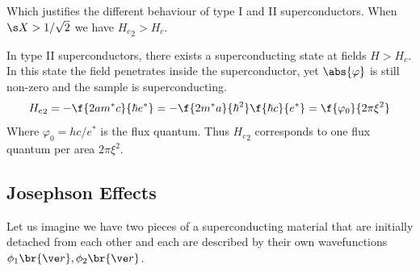 \documentclass{article}
\newcommand{\vp}{\varphi}
\begin{document}
Which justifies the different behaviour of type I and II superconductors. When $\s X > 1 / \sqrt{2}$ we have ${H_c}_2 > H_c$.
\begin{center}
\end{center}
In type II superconductors, there exists a superconducting state at fields $H > H_c$. In this state the field penetrates inside the superconductor, yet $\abs{\vp}$ is still non-zero and the sample is superconducting.
\[ {H_c}_2 = -\f{2a m^* c}{\hbar e^*} = - \f{2m^* a}{\hbar^2} \f{\hbar c}{e^*} = \f{\varphi_0}{2 \pi \xi^2} \]
Where $\varphi_0 = h c /e^*$ is the flux quantum. Thus ${H_c}_2$ corresponds to one flux quantum per area $2 \pi \xi^2$.

\subsection{Josephson Effects}
Let us imagine we have two pieces of a superconducting material that are initially detached from each other and each are described by their own wavefunctions $\phi_1\br{\ve r}, \phi_2\br{\ve r}$.
\begin{center}
\end{center}
\end{document}

